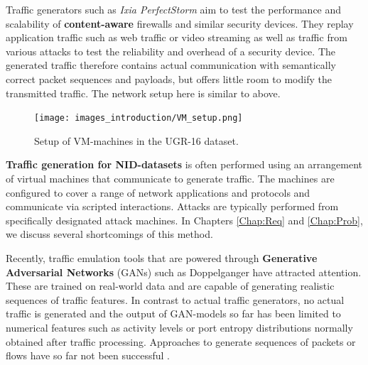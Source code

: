 Traffic generators such as \textit{Ixia PerfectStorm} aim to test the performance and scalability of \textbf{content-aware} firewalls and similar security devices. They replay application traffic such as web traffic or video streaming as well as traffic from various attacks to test the reliability and overhead of a security device. The generated traffic therefore contains actual communication with semantically correct packet sequences and payloads, but offers little room to modify the transmitted traffic. The network setup here is similar to above.

\begin{figure}
\centering
\texttt{[image: images\_introduction/VM\_setup.png]}
\caption{Setup of VM-machines in the UGR-16 dataset.}\label{Fig:VM_generation}
\end{figure}

\textbf{Traffic generation for NID-datasets} is often performed using an arrangement of virtual machines that communicate to generate traffic. The machines are configured to cover a range of network applications and protocols and communicate via scripted interactions. Attacks are typically performed from specifically designated attack machines. In Chapters  \ref{Chap:Req} and \ref{Chap:Prob}, we discuss several shortcomings of this method.

Recently, traffic emulation tools that are powered through \textbf{Generative Adversarial Networks} (GANs) such as Doppelganger \cite{lin2019generating} have attracted attention. These are trained on real-world data and are capable of generating realistic sequences of traffic features. In contrast to actual traffic generators, no actual traffic is generated and the output of GAN-models so far has been limited to numerical features such as activity levels or port entropy distributions normally obtained after traffic processing. Approaches to generate sequences of packets or flows have so far not been successful \cite{cheng2019pac,cheng2021packet}.

 






